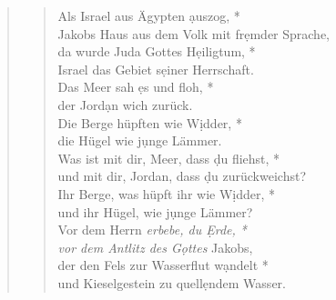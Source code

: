 \begin{quote}
\begin{verse}
Als Israel aus Ägypten \d auszog, *\\
Jakobs Haus aus dem Volk mit fr\d emder Sprache, \\ 
\vin da wurde Juda Gottes H\d eiligtum, *\\ 
\vin Israel das Gebiet s\d einer Herrschaft.\\  
Das Meer sah \d es und floh, *\\
der Jord\d an wich zurück.\\ 
\vin Die Berge hüpften wie W\d idder, *\\ 
\vin die Hügel wie j\d unge Lämmer.\\  
Was ist mit dir, Meer, dass \d du fliehst, *\\
und mit dir, Jordan, dass \d du zurückweichst?\\ 
\vin Ihr Berge, was hüpft ihr wie W\d idder, *\\ 
\vin und ihr Hügel, wie j\d unge Lämmer?\\  
Vor dem Herrn \textit{erbebe, du \d Erde, *\\
vor dem Antlitz des G\d ottes} Jakobs,\\ 
\vin der den Fels zur Wasserflut w\d andelt *\\ 
\vin und Kieselgestein zu quell\d endem Wasser.\\  
\end{verse}
\end{quote}



\def\greinitialformat#1{{\fontsize{40}{40}\selectfont #1}}
\gresetfirstlineaboveinitial{\small \textcolor{red}{Ps 115}}{}
\setaboveinitialseparation{0.72mm}


\vspace{0.3cm}


